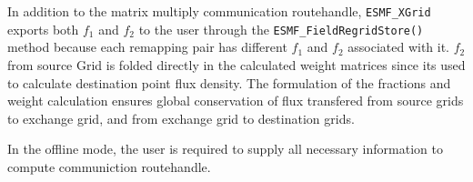 In addition to the matrix multiply communication routehandle, 
{\tt ESMF\_XGrid} exports both $f_1$ and $f_2$ to the user through the {\tt ESMF\_FieldRegridStore()} method
because each remapping pair has different $f_1$ and $f_2$ associated with it. $f_2$ from source Grid is 
folded directly in the calculated weight matrices since its used to calculate destination point flux
density. The formulation of the fractions and weight calculation ensures global conservation of
flux transfered from source grids to exchange grid, and from exchange grid to destination grids.

In the offline mode, the user is required to supply all necessary information to 
compute communiction routehandle.

